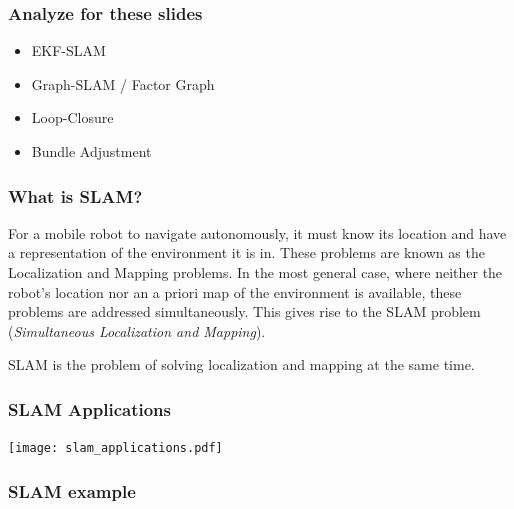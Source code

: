 \begin{frame}
    \frametitle{Analyze for these slides}
    
    \begin{itemize}
    \item EKF-SLAM
    \item Graph-SLAM / Factor Graph
    \item Loop-Closure
    \item Bundle Adjustment
    \end{itemize}
    
    \end{frame}
    
    \begin{frame}
    \frametitle{What is SLAM?}
    
    For a mobile robot to navigate autonomously, it must know its location and have a representation of the environment it is in. These problems are known as the Localization and Mapping problems. In the most general case, where neither the robot's location nor an a priori map of the environment is available, these problems are addressed simultaneously. This gives rise to the SLAM problem (\emph{Simultaneous Localization and Mapping}).
    \begin{block}{}
    SLAM is the problem of solving localization and mapping at the same time.
    \end{block}
    
    \end{frame}

    \begin{frame}
        \frametitle{SLAM Applications}
        
        \begin{center}
            \texttt{[image: slam\_applications.pdf]}
        \end{center}
        
    \end{frame}
    
    
    \begin{frame}
     \frametitle{SLAM example}
    
     \begin{figure}
     \hfill{}
     \end{figure}
    
    \end{frame}
    
